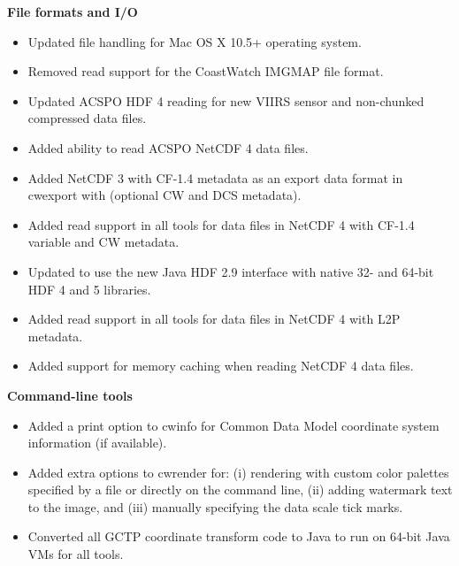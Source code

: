 \hspace{0.4cm} {\bf File formats and I/O}

\begin{itemize}

  \item Updated file handling for Mac OS X 10.5+ operating system.

  \item Removed read support for the CoastWatch IMGMAP file format.

  \item Updated ACSPO HDF 4 reading for new VIIRS sensor and non-chunked
  compressed data files.

  \item Added ability to read ACSPO NetCDF 4 data files.

  \item Added NetCDF 3 with CF-1.4 metadata as an export data format in
  cwexport with (optional CW and DCS metadata).

  \item Added read support in all tools for data files in NetCDF 4 with CF-1.4
  variable and CW metadata.

  \item Updated to use the new Java HDF 2.9 interface with native 32- and
  64-bit HDF 4 and 5 libraries.

  \item Added read support in all tools for data files in NetCDF 4 with L2P
  metadata.

  \item Added support for memory caching when reading NetCDF 4 data files.

\end{itemize}

\hspace{0.4cm} {\bf Command-line tools}

\begin{itemize}

  \item Added a print option to cwinfo for Common Data Model coordinate
  system information (if available).

  \item Added extra options to cwrender for: (i) rendering with custom color
  palettes specified by a file or directly on the command line, (ii) adding
  watermark text to the image, and (iii) manually specifying the data scale
  tick marks.

  \item Converted all GCTP coordinate transform code to Java to run on 64-bit
  Java VMs for all tools.

\end{itemize}

